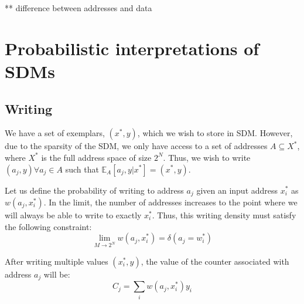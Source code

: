 \documentclass[10pt,letterpaper]{article}
\begin{document}


** difference between addresses and data \\



\section{Probabilistic interpretations of SDMs}


\subsection{Writing}

We have a set of exemplars, $(x^*, y)$, which we wish to store in
SDM. However, due to the sparsity of the SDM, we only have access to a
set of addresses $A\subseteq X^*$, where $X^*$ is the full address
space of size $2^N$. Thus, we wish to write $(a_j, y)\forall a_j\in A$
such that $\mathbb{E}_A[a_j, y|x^*]=(x^*,y)$.

Let us define the probability of writing to address $a_j$ given an
input address $x_i^*$ as $w(a_j,x_i^*)$. In the limit, the number of
addresses increases to the point where we will always be able to write
to exactly $x_i^*$. Thus, this writing density must satisfy the
following constraint:
\begin{equation}
\lim_{M\rightarrow 2^N}w(a_j,x_i^*) = \delta(a_j=w_i^*)
\label{eq:w}
\end{equation}

After writing multiple values $(x_i^*, y)$, the value of the counter
associated with address $a_j$ will be:
\begin{equation}
C_j=\sum_i w(a_j,x_i^*)y_i
\label{eq:Cj}
\end{equation}
\end{document}
